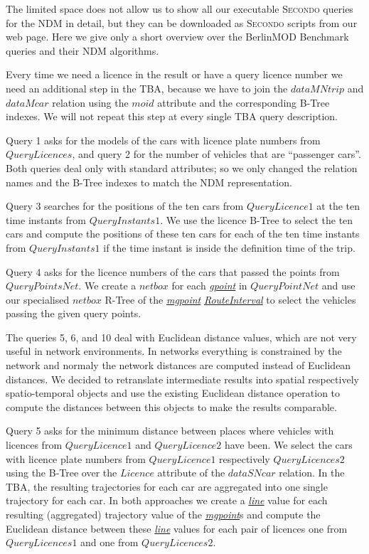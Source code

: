 \documentclass[a4paper]{article}
\newcommand{\secondo}{\textsc{Secondo}}
\newcommand{\bmodb} {BerlinMOD Benchmark}
\newcommand{\dt}[1]{\textsl{\underline{#1}}}
\begin{document}
{The limited space does not allow us to show all our executable \secondo{} queries
for the NDM in detail, but they can be downloaded as \secondo{} scripts
from our web page. Here we give only a short overview over the \bmodb{} queries
and their NDM algorithms.

Every time we need a licence in the result or have a query licence number we need
an additional step in the TBA, because we have to join the $dataMNtrip$ and $dataMcar$
relation using the $moid$ attribute and the corresponding B-Tree indexes.
We will not repeat this step at every single TBA query description.

Query 1 asks for the models of the cars with licence plate numbers from $QueryLicences$,
and query 2 for the number of vehicles that are ``passenger cars''. Both queries
deal only with standard attributes; so we only changed the relation names and the
B-Tree indexes to match the NDM representation.

Query 3 searches for the positions of the ten cars from $QueryLicence1$ at the
ten time instants from $QueryInstants1$. We use the licence B-Tree to select the
ten cars and compute the positions of these ten cars for each of the ten time
instants from $QueryInstants1$ if the time instant is inside the definition time
of the trip.

Query 4 asks for the licence numbers of the cars that passed the points
from $QueryPointsNet$. We create a $netbox$ for each \dt{gpoint} in $QueryPointNet$
and use our specialised $netbox$ R-Tree of the \dt{mgpoint} \dt{RouteInterval} to
select the vehicles passing the given query points.

The queries 5, 6, and 10 deal with Euclidean distance values, which are not very
useful in network environments. In networks everything is constrained by the
network and normaly the network distances are computed instead of Euclidean
distances. We decided to retranslate intermediate results
into spatial respectively spatio-temporal objects and use the existing
Euclidean distance operation to compute the distances between this objects to make
the results comparable.

Query 5 asks for the minimum distance between places where vehicles with
licences from $QueryLicence1$ and $QueryLicence2$ have been. We select the cars
with licence plate numbers from $QueryLicence1$ respectively $QueryLicences2$ using the
B-Tree over the $Licence$ attribute of the $dataSNcar$ relation. In the TBA, the
resulting trajectories for each car are aggregated into one single trajectory
for each car. In both approaches we create a \dt{line} value for each resulting
(aggregated) trajectory value of the \dt{mgpoint}s and compute the Euclidean distance
between these \dt{line} values for each pair of licences one from $QueryLicences1$ and one
from $QueryLicences2$.

}
\end{document}
